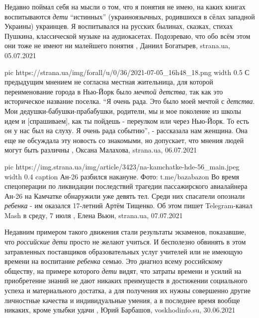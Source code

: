 Недавно поймал себя на мысли о том, что я понятия не имею, на каких книгах
воспитываются \emph{дети} \enquote{истинных} (украиноязычных, родившихся в сёлах западной
Украины) украинцев. Я воспитывался на русских былинах, сказках, стихах Пушкина,
классической музыке на аудиокасетах. Подозреваю, что обо всём этом они тоже не
имеют ни малейшего понятия
, 
Даниил Богатырев, strana.ua, 05.07.2021

\ifcmt
  pic https://strana.ua/img/forall/u/0/36/2021-07-05_16h48_18.png
  width 0.5
\fi
С предыдущим мнением не согласна местная жительница, для которой переименование
города в Нью-Йорк было \emph{мечтой детства}, так как это историческое название
поселка.  \enquote{Я очень рада. Это было моей мечтой с \emph{детства}. Мои
дедушки-бабушки-прабабушки, родители, мы и мое поколение из школы идем и
[спрашиваем], как ты пойдешь - переулком или через Нью-Йорк. То есть он у нас
был на слуху. Я очень рада событию}, - рассказала нам женщина.  Она еще не
обсуждала эту новость со знакомыми, но допускает, что мнения людей могут быть
различны
, 
Оксана Малахова, strana.ua, 06.07.2021

\ifcmt
  pic https://img.strana.ua/img/article/3423/na-kamchatke-hde-56_main.jpeg
  width 0.4
  caption Ан-26 разбился накануне. Фото: t.me/bazabazon 
\fi
Во время спецоперации по ликвидации последствий трагедии пассажирского
авиалайнера Ан-26 на Камчатке обнаружили уже девять тел. Среди них спасатели
опознали \emph{ребенка} - им оказался 17-летний Артём Тищенко.  Об этом пишет
Telegram-канал Mash в среду, 7 июля
, 
Елена Вьюн, strana.ua, 07.07.2021

Недавним примером такого движения стали результаты экзаменов, показавшие, что
\emph{российские дети} просто не желают учиться. И бесполезно обвинять в этом
затравленных поставщиков образовательных услуг учителей или не имеющую времени
на воспитание \emph{ребенка} семью. Это диагноз всему российскому обществу, на примере
которого \emph{дети} видят, что затраты времени и усилий на приобретение знаний не
дают никаких преимуществ в достижении социального успеха и материального
достатка, а для получения их нужны совершенно другие личностные качества и
индивидуальные умения, а в последнее время вообще никаких, кроме улыбки удачи
, 
Юрий Барбашов, voskhodinfo.su, 30.06.2021

